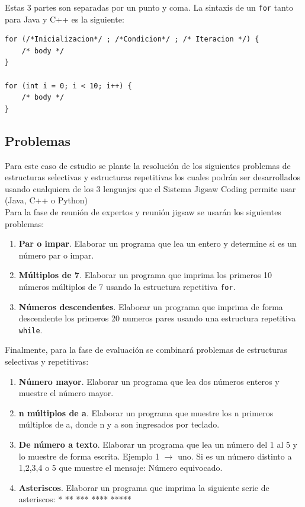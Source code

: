Estas 3 partes son separadas por un punto y coma. La sintaxis de un \texttt{for} tanto para Java y C++ es la siguiente:

\begin{lstlisting}
for (/*Inicializacion*/ ; /*Condicion*/ ; /* Iteracion */) {
	/* body */
}

for (int i = 0; i < 10; i++) {
	/* body */
}
\end{lstlisting}


\subsection{Problemas}
Para este caso de estudio se plante la resolución de los siguientes problemas de estructuras selectivas y estructuras repetitivas los cuales podrán ser desarrollados usando cualquiera de los 3 lenguajes que el Sistema Jigsaw Coding permite usar (Java, C++ o Python)\\

Para la fase de reunión de expertos y reunión jigsaw se usarán los siguientes problemas:

\begin{enumerate}
	\item \textbf{Par o impar}. Elaborar un programa que lea un entero y determine si es un número par o impar.
	\item \textbf{Múltiplos de 7}. Elaborar un programa que imprima los primeros 10 números múltiplos de 7 usando la estructura repetitiva \texttt{for}.
	\item \textbf{Números descendentes}. Elaborar un programa que imprima de forma descendente los primeros 20 numeros pares usando una estructura repetitiva \texttt{while}.
\end{enumerate}

Finalmente, para la fase de evaluación se combinará problemas de estructuras selectivas y repetitivas:

\begin{enumerate}
 	\item \textbf{Número mayor}. Elaborar un programa que lea dos números enteros y muestre el número mayor.
 	\item \textbf{n múltiplos de a}. Elaborar un programa que muestre los n primeros múltiplos de a, donde n y a son ingresados por teclado.
 	\item \textbf{De número a texto}. Elaborar un programa que lea un número del 1 al 5 y lo muestre de forma escrita. Ejemplo 1 $\longrightarrow$ uno. Si es un número distinto a 1,2,3,4 o 5 que muestre el mensaje: Número equivocado.
 	\item \textbf{Asteriscos}. Elaborar un programa que imprima la siguiente serie de asteriscos: \newline 	
 		\hbox{*} \newline
 		\hbox{**} \newline
 		\hbox{***} \newline
 		\hbox{****} \newline
 		\hbox{*****} 	
\end{enumerate}

